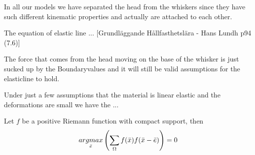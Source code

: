 In all our models we have separated the head from the whiskers since they have
such different kinematic properties and actually are attached to each other.




The equation of elastic line ... [Grundläggande Hållfasthetslära - Hans Lundh
p94 (7.6)]

The force that comes from the head moving on the base of the whisker is just 
sucked up by the Boundaryvalues and it will still be valid assumptions for the
elasticline to hold.

Under just a few assumptions that the material is linear elastic and the
deformations are small we have the ...



\begin{theorem} %
    \label{thm:response_max}
    Let $f$ be a positive Riemann function with compact support, then
    \begin{equation}
        \underset{\bar{e}}{argmax}
            \left(
            \sum\limits_{\Omega}{f(\bar{x})f(\bar{x}-\bar{e})}
            \right)
            =0
    \end{equation}
\end{theorem}
